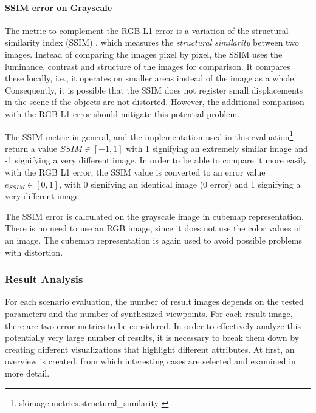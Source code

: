 \paragraph{SSIM error on Grayscale}
The metric to complement the RGB L1 error is a variation of the structural similarity index (SSIM) \cite{ssim}, which measures the \emph{structural similarity} between two images. Instead of comparing the images pixel by pixel, the SSIM uses the luminance, contrast and structure of the images for comparison. It compares these locally, i.e., it operates on smaller areas instead of the image as a whole. Consequently, it is possible that the SSIM does not register small displacements in the scene if the objects are not distorted. However, the additional comparison with the RGB L1 error should mitigate this potential problem.

The SSIM metric in general, and the implementation used in this evaluation\footnote{skimage.metrics.structural\_similarity \cite{skimage}} return a value $SSIM \in [-1, 1]$ with 1 signifying an extremely similar image and -1 signifying a very different image. In order to be able to compare it more easily with the RGB L1 error, the SSIM value is converted to an error value $ e_{SSIM} \in [0,1]$, with 0 signifying an identical image (0 error) and 1 signifying a very different image.

The SSIM error is calculated on the grayscale image in cubemap representation. There is no need to use an RGB image, since it does not use the color values of an image. The cubemap representation is again used to avoid possible problems with distortion.

\subsubsection{Result Analysis}
For each scenario evaluation, the number of result images depends on the tested parameters and the number of synthesized viewpoints. For each result image, there are two error metrics to be considered.
In order to effectively analyze this potentially very large number of results, it is necessary to break them down by creating different visualizations that highlight different attributes. At first, an overview is created, from which interesting cases are selected and examined in more detail.

